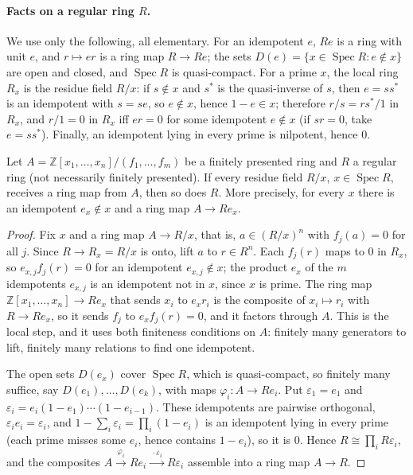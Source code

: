\paragraph{Facts on a regular ring $R$.} We use only the following, all elementary. For an idempotent $e$, $Re$ is a ring with unit $e$, and $r\mapsto er$ is a ring map $R\to Re$; the sets $D(e) = \{x\in\operatorname{Spec}R : e\notin x\}$ are open and closed, and $\operatorname{Spec}R$ is quasi-compact. For a prime $x$, the local ring $R_x$ is the residue field $R/x$: if $s\notin x$ and $s^*$ is the quasi-inverse of $s$, then $e = ss^*$ is an idempotent with $s = se$, so $e\notin x$, hence $1-e\in x$; therefore $r/s = rs^*/1$ in $R_x$, and $r/1 = 0$ in $R_x$ iff $er = 0$ for some idempotent $e\notin x$ (if $sr = 0$, take $e = ss^*$). Finally, an idempotent lying in every prime is nilpotent, hence $0$.

\begin{lemma}\label{lem:pf-local}
Let $A = \mathbb Z[x_1,\dots,x_n]/(f_1,\dots,f_m)$ be a finitely presented ring and $R$ a regular ring (not necessarily finitely presented). If every residue field $R/x$, $x\in\operatorname{Spec}R$, receives a ring map from $A$, then so does $R$. More precisely, for every $x$ there is an idempotent $e_x\notin x$ and a ring map $A\to Re_x$.
\end{lemma}

\begin{proof}
Fix $x$ and a ring map $A\to R/x$, that is, $a\in(R/x)^n$ with $f_j(a) = 0$ for all $j$. Since $R\to R_x = R/x$ is onto, lift $a$ to $r\in R^n$. Each $f_j(r)$ maps to $0$ in $R_x$, so $e_{x,j}f_j(r) = 0$ for an idempotent $e_{x,j}\notin x$; the product $e_x$ of the $m$ idempotents $e_{x,j}$ is an idempotent not in $x$, since $x$ is prime. The ring map $\mathbb Z[x_1,\dots,x_n]\to Re_x$ that sends $x_i$ to $e_xr_i$ is the composite of $x_i\mapsto r_i$ with $R\to Re_x$, so it sends $f_j$ to $e_xf_j(r) = 0$, and it factors through $A$. This is the local step, and it uses both finiteness conditions on $A$: finitely many generators to lift, finitely many relations to find one idempotent.

The open sets $D(e_x)$ cover $\operatorname{Spec}R$, which is quasi-compact, so finitely many suffice, say $D(e_1),\dots,D(e_k)$, with maps $\varphi_i\colon A\to Re_i$. Put $\varepsilon_1 = e_1$ and $\varepsilon_i = e_i(1-e_1)\cdots(1-e_{i-1})$. These idempotents are pairwise orthogonal, $\varepsilon_ie_i = \varepsilon_i$, and $1-\sum_i\varepsilon_i = \prod_i(1-e_i)$ is an idempotent lying in every prime (each prime misses some $e_i$, hence contains $1-e_i$), so it is $0$. Hence $R\cong\prod_iR\varepsilon_i$, and the composites $A\xrightarrow{\varphi_i}Re_i\xrightarrow{\ \cdot\varepsilon_i\ }R\varepsilon_i$ assemble into a ring map $A\to R$.
\end{proof}

